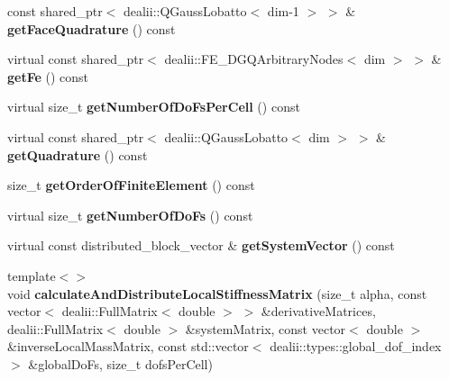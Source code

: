 \begin{DoxyCompactItemize}
\item 
\hypertarget{classnatrium_1_1SEDGMinLee_a653928dc9f0dd3715389b28196cab7bb}{
const shared\_\-ptr$<$ dealii::QGaussLobatto$<$ dim-\/1 $>$ $>$ \& {\bfseries getFaceQuadrature} () const }
\label{classnatrium_1_1SEDGMinLee_a653928dc9f0dd3715389b28196cab7bb}

\item 
\hypertarget{classnatrium_1_1SEDGMinLee_a7fd488e872e5cf9870be39f07a2dcd74}{
virtual const shared\_\-ptr$<$ dealii::FE\_\-DGQArbitraryNodes$<$ dim $>$ $>$ \& {\bfseries getFe} () const }
\label{classnatrium_1_1SEDGMinLee_a7fd488e872e5cf9870be39f07a2dcd74}

\item 
\hypertarget{classnatrium_1_1SEDGMinLee_a5dac839ef4963af315dba5f201bd763c}{
virtual size\_\-t {\bfseries getNumberOfDoFsPerCell} () const }
\label{classnatrium_1_1SEDGMinLee_a5dac839ef4963af315dba5f201bd763c}

\item 
\hypertarget{classnatrium_1_1SEDGMinLee_a4db0d2b4c857962d5425f755be3daf13}{
virtual const shared\_\-ptr$<$ dealii::QGaussLobatto$<$ dim $>$ $>$ \& {\bfseries getQuadrature} () const }
\label{classnatrium_1_1SEDGMinLee_a4db0d2b4c857962d5425f755be3daf13}

\item 
\hypertarget{classnatrium_1_1SEDGMinLee_a745a65de3ee72a250c0706e6c7fcc361}{
size\_\-t {\bfseries getOrderOfFiniteElement} () const }
\label{classnatrium_1_1SEDGMinLee_a745a65de3ee72a250c0706e6c7fcc361}

\item 
\hypertarget{classnatrium_1_1SEDGMinLee_af667cda1a894340f614da67c0a0ae5da}{
virtual size\_\-t {\bfseries getNumberOfDoFs} () const }
\label{classnatrium_1_1SEDGMinLee_af667cda1a894340f614da67c0a0ae5da}

\item 
\hypertarget{classnatrium_1_1SEDGMinLee_ac4d17489cf8bf5e98bd7bd4e3e32f0d4}{
virtual const distributed\_\-block\_\-vector \& {\bfseries getSystemVector} () const }
\label{classnatrium_1_1SEDGMinLee_ac4d17489cf8bf5e98bd7bd4e3e32f0d4}

\item 
\hypertarget{classnatrium_1_1SEDGMinLee_ab9bdc47144e9e45960ca1bee2593d713}{
{\footnotesize template$<$$>$ }\\void {\bfseries calculateAndDistributeLocalStiffnessMatrix} (size\_\-t alpha, const vector$<$ dealii::FullMatrix$<$ double $>$ $>$ \&derivativeMatrices, dealii::FullMatrix$<$ double $>$ \&systemMatrix, const vector$<$ double $>$ \&inverseLocalMassMatrix, const std::vector$<$ dealii::types::global\_\-dof\_\-index $>$ \&globalDoFs, size\_\-t dofsPerCell)}
\label{classnatrium_1_1SEDGMinLee_ab9bdc47144e9e45960ca1bee2593d713}


\end{DoxyCompactItemize}
